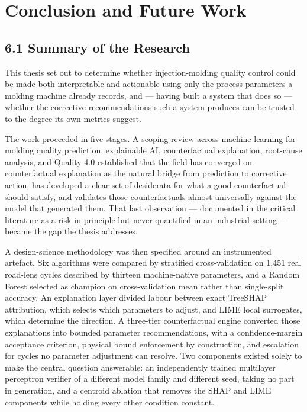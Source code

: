 \hypertarget{conclusion-and-future-work}{%
\chapter{Conclusion and Future Work}\label{conclusion-and-future-work}}

\hypertarget{summary-of-the-research}{%
\section{6.1 Summary of the Research}\label{summary-of-the-research}}

This thesis set out to determine whether injection-molding quality control could be made both interpretable and actionable using only the process parameters a molding machine already records, and --- having built a system that does so --- whether the corrective recommendations such a system produces can be trusted to the degree its own metrics suggest.

The work proceeded in five stages. A scoping review across machine learning for molding quality prediction, explainable AI, counterfactual explanation, root-cause analysis, and Quality 4.0 established that the field has converged on counterfactual explanation as the natural bridge from prediction to corrective action, has developed a clear set of desiderata for what a good counterfactual should satisfy, and validates those counterfactuals almost universally against the model that generated them. That last observation --- documented in the critical literature as a risk in principle but never quantified in an industrial setting --- became the gap the thesis addresses.

A design-science methodology was then specified around an instrumented artefact. Six algorithms were compared by stratified cross-validation on 1,451 real road-lens cycles described by thirteen machine-native parameters, and a Random Forest selected as champion on cross-validation mean rather than single-split accuracy. An explanation layer divided labour between exact TreeSHAP attribution, which selects which parameters to adjust, and LIME local surrogates, which determine the direction. A three-tier counterfactual engine converted those explanations into bounded parameter recommendations, with a confidence-margin acceptance criterion, physical bound enforcement by construction, and escalation for cycles no parameter adjustment can resolve. Two components existed solely to make the central question answerable: an independently trained multilayer perceptron verifier of a different model family and different seed, taking no part in generation, and a centroid ablation that removes the SHAP and LIME components while holding every other condition constant.

